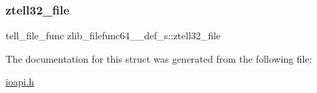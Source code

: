 \subsubsection{\texorpdfstring{ztell32\+\_\+file}{ztell32\_file}}
{\footnotesize\ttfamily tell\+\_\+file\+\_\+func zlib\+\_\+filefunc64\+\_\+\_\+def\+\_\+s\+::ztell32\+\_\+file}



The documentation for this struct was generated from the following file\+:\begin{DoxyCompactItemize}
\item 
\hyperlink{ioapi_8h}{ioapi.\+h}\end{DoxyCompactItemize}
